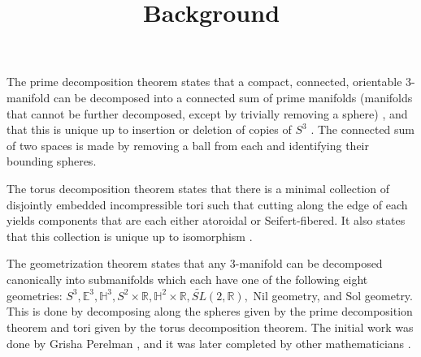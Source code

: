 \documentclass[12pt]{amsart}
\newcommand{\ignore}[1]{}
\begin{document}
\title{Background}
\maketitle

\ignore{1.  Describe 3-manifold decompositions.
  A.  Prime decomposition theorem -- see Allen Hatcher's notes for statement and references.

}
\ignore{@Misc{•,
OPTkey = {•},
OPTauthor = {Allen Hatcher},
OPTtitle = {Notes on Basic 3-Manifold Topology},
OPThowpublished = {•},
OPTmonth = {•},
OPTyear = {•},
OPTnote = {•},
OPTannote = {•}
}}

The prime decomposition theorem states that a compact, connected, orientable 3-manifold can be decomposed into a connected sum of prime manifolds (manifolds that cannot be further decomposed, except by trivially removing a sphere) \cite{Kneser}, and that this is unique up to insertion or deletion of copies of $S^3$ \cite{Milnor}. The connected sum of two spaces is made by removing a ball from each and identifying their bounding spheres.
  

The torus decomposition theorem states that there is a minimal collection of disjointly embedded incompressible tori such that cutting along the edge of each yields components that are each either atoroidal or Seifert-fibered. It also states that this collection is unique up to isomorphism \cite{JSJ3} \cite{JSJ2} \cite{JSJ1} \cite{JSJ4}.



The geometrization theorem states that any 3-manifold can be decomposed canonically into submanifolds which each have one of the following eight geometries: $S^3, \mathbb{E}^3, \mathbb{H}^3, S^2 \times \mathbb{R}, \mathbb{H}^2 \times \mathbb{R}, \tilde{SL}(2,\mathbb{R}),$ Nil geometry, and Sol geometry. This is done by decomposing along the spheres given by the prime decomposition theorem and tori given by the torus decomposition theorem. The initial work was done by Grisha Perelman \cite{Perelman1} \cite{Perelman3} \cite{Perelman2}, and it was later completed by other mathematicians \cite{Geometrization1} \cite{Geometrization2} \cite{Geometrization3}.
\end{document}

